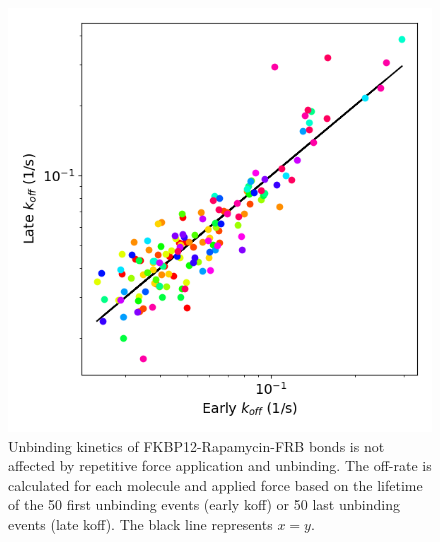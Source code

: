\documentclass{biophys-new}
\begin{document}
\begin{figure}[hbt!]
	\centering
	\includegraphics[width=0.6\linewidth]{Figures/Maturation_Rapa.png}
	\caption{Unbinding kinetics of FKBP12-Rapamycin-FRB bonds is not affected by repetitive force application and unbinding. The off-rate is calculated for each molecule and applied force based on the lifetime of the 50 first unbinding events (early koff) or 50 last unbinding events (late koff). The black line represents $x=y$.}
	\label{fig:maturation}
\end{figure}


\end{document}
